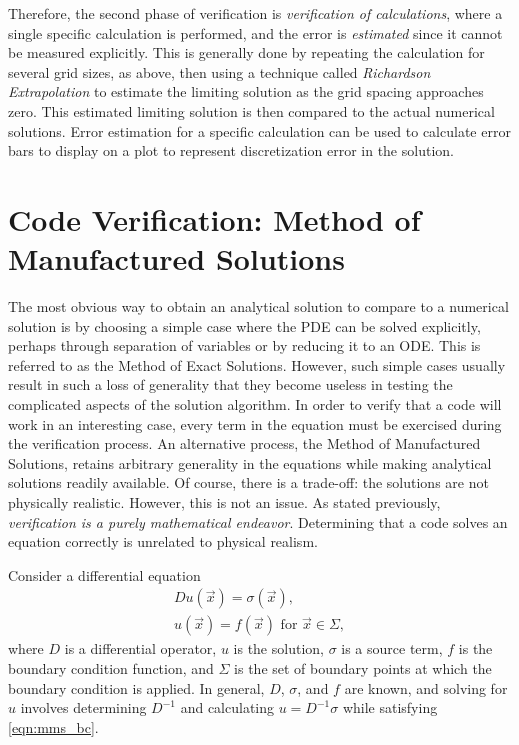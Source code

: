 Therefore, the second phase of verification is \textit{verification of calculations}, where a single specific calculation is performed, and the error is \textit{estimated} since it cannot be measured explicitly.
This is generally done by repeating the calculation for several grid sizes, as above, then using a technique called \textit{Richardson Extrapolation} to estimate the limiting solution as the grid spacing approaches zero.
This estimated limiting solution is then compared to the actual numerical solutions.
Error estimation for a specific calculation can be used to calculate error bars to display on a plot to represent discretization error in the solution.

\section{Code Verification: Method of Manufactured Solutions}

The most obvious way to obtain an analytical solution to compare to a numerical solution is by choosing a simple case where the PDE can be solved explicitly, perhaps through separation of variables or by reducing it to an ODE.
This is referred to as the Method of Exact Solutions.
However, such simple cases usually result in such a loss of generality that they become useless in testing the complicated aspects of the solution algorithm.
In order to verify that a code will work in an interesting case, every term in the equation must be exercised during the verification process.
An alternative process, the Method of Manufactured Solutions, retains arbitrary generality in the equations while making analytical solutions readily available.
Of course, there is a trade-off: the solutions are not physically realistic.
However, this is not an issue.
As stated previously, \textit{verification is a purely mathematical endeavor}.
Determining that a code solves an equation correctly is unrelated to physical realism.

Consider a differential equation
\begin{align}
  Du(\vec{x}) = \sigma(\vec{x}), \label{eqn:mms_de} \\
  u(\vec{x})=f(\vec{x}) \mbox{ for } \vec{x} \in \Sigma,
  \label{eqn:mms_bc}
\end{align}
where $D$ is a differential operator, $u$ is the solution, $\sigma$ is a source term, $f$ is the boundary condition function, and $\Sigma$ is the set of boundary points at which the boundary condition is applied.
In general, $D$, $\sigma$, and $f$ are known, and solving for $u$ involves determining $D^{-1}$ and calculating $u = D^{-1}\sigma$ while satisfying \eqref{eqn:mms_bc}.

